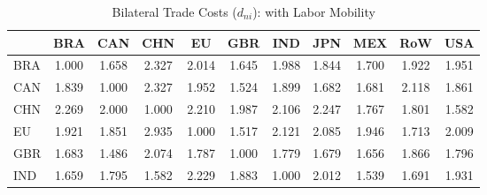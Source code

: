 \begin{table}[htbp]
\centering
\caption{Bilateral Trade Costs ($d_{ni}$): with Labor Mobility} 
\label{tab:bilateral_costs}
\begin{tabular}{lcccccccccc}
  \hline
 & BRA & CAN & CHN & EU & GBR & IND & JPN & MEX & RoW & USA \\ 
  \hline
BRA & \textcolor[RGB]{230,148,26}{1.000} & \textcolor[RGB]{191,124,64}{1.658} & \textcolor[RGB]{10,7,245}{2.327} & \textcolor[RGB]{46,30,209}{2.014} & \textcolor[RGB]{196,127,59}{1.645} & \textcolor[RGB]{61,40,194}{1.988} & \textcolor[RGB]{112,73,143}{1.844} & \textcolor[RGB]{163,106,92}{1.700} & \textcolor[RGB]{92,59,163}{1.922} & \textcolor[RGB]{74,48,181}{1.951} \\ 
  CAN & \textcolor[RGB]{117,76,138}{1.839} & \textcolor[RGB]{230,148,26}{1.000} & \textcolor[RGB]{8,5,247}{2.327} & \textcolor[RGB]{71,46,184}{1.952} & \textcolor[RGB]{222,144,33}{1.524} & \textcolor[RGB]{99,64,156}{1.899} & \textcolor[RGB]{173,112,82}{1.682} & \textcolor[RGB]{176,114,79}{1.681} & \textcolor[RGB]{28,18,227}{2.118} & \textcolor[RGB]{107,69,148}{1.861} \\ 
  CHN & \textcolor[RGB]{13,8,242}{2.269} & \textcolor[RGB]{56,36,199}{2.000} & \textcolor[RGB]{230,148,26}{1.000} & \textcolor[RGB]{20,13,235}{2.210} & \textcolor[RGB]{64,41,191}{1.987} & \textcolor[RGB]{31,20,224}{2.106} & \textcolor[RGB]{15,10,240}{2.247} & \textcolor[RGB]{143,92,112}{1.767} & \textcolor[RGB]{125,81,130}{1.801} & \textcolor[RGB]{212,137,43}{1.582} \\ 
  EU & \textcolor[RGB]{94,61,161}{1.921} & \textcolor[RGB]{110,71,145}{1.851} & \textcolor[RGB]{0,0,255}{2.935} & \textcolor[RGB]{230,148,26}{1.000} & \textcolor[RGB]{224,145,31}{1.517} & \textcolor[RGB]{25,16,230}{2.121} & \textcolor[RGB]{36,23,219}{2.085} & \textcolor[RGB]{79,51,176}{1.946} & \textcolor[RGB]{161,104,94}{1.713} & \textcolor[RGB]{51,33,204}{2.009} \\ 
  GBR & \textcolor[RGB]{171,111,84}{1.683} & \textcolor[RGB]{227,147,28}{1.486} & \textcolor[RGB]{38,25,217}{2.074} & \textcolor[RGB]{133,86,122}{1.787} & \textcolor[RGB]{230,148,26}{1.000} & \textcolor[RGB]{138,89,117}{1.779} & \textcolor[RGB]{178,115,76}{1.679} & \textcolor[RGB]{194,125,61}{1.656} & \textcolor[RGB]{105,68,150}{1.866} & \textcolor[RGB]{128,82,128}{1.796} \\ 
  IND & \textcolor[RGB]{189,122,66}{1.659} & \textcolor[RGB]{130,84,125}{1.795} & \textcolor[RGB]{209,135,46}{1.582} & \textcolor[RGB]{18,12,237}{2.229} & \textcolor[RGB]{102,66,153}{1.883} & \textcolor[RGB]{230,148,26}{1.000} & \textcolor[RGB]{48,31,207}{2.012} & \textcolor[RGB]{217,140,38}{1.539} & \textcolor[RGB]{166,107,89}{1.691} & \textcolor[RGB]{87,56,168}{1.931} \\ 

\end{tabular}
\end{table}
